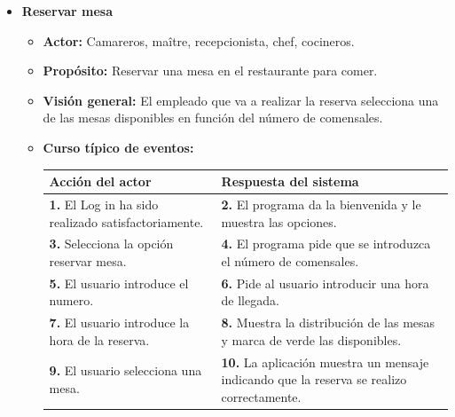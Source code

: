 \documentclass[spanish,a4paper,12pt]{report}		%
\begin{document}
\begin{itemize}
		
		\newpage
		\hspace{-2.4 true cm}	
		\item \textbf{Reservar mesa} 
			\begin{itemize}
			\item \textbf{Actor:} Camareros, maître, recepcionista, chef, cocineros.
			\item \textbf{Propósito: } Reservar una mesa en el restaurante para comer.
			\item \textbf{Visión general:} El empleado que va a realizar la reserva selecciona una de las mesas disponibles en función del número de comensales.
			\item \textbf{Curso típico de eventos:} 	\\
				\begin{tabular}{|p{6cm}||p{6cm}|}
				\hline
				\textbf{Acción del actor} & \textbf{Respuesta del sistema} \\ \hline \hline
				\textbf{1.}  El Log in ha sido realizado satisfactoriamente. & \textbf{2.} El programa da la bienvenida y le muestra las opciones. \\ \hline
				\textbf{3.} Selecciona la opción reservar mesa. & \textbf{4.} El programa pide que se introduzca el número de comensales. \\ \hline
				\textbf{5.} El usuario introduce el numero.	& \textbf{6.} Pide al usuario introducir una hora de llegada. \\ \hline
				\textbf{7.} El usuario introduce la hora de la reserva.	& \textbf{8.} Muestra la distribución de las mesas y marca de verde las disponibles. \\ \hline
				\textbf{9.} El usuario selecciona una mesa. & \textbf{10.} La aplicación muestra un mensaje indicando que la reserva se realizo correctamente. \\ \hline

\end{tabular}
\end{itemize}
\end{itemize}
\end{document}
